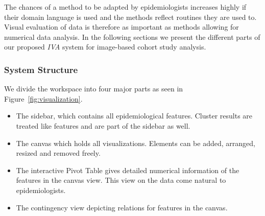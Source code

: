 \documentclass[journal]{style/vgtc} 			          %
\begin{document}
%
%
The chances of a method to be adapted by epidemiologists increases highly if their domain language is used and the methods reflect routines they are used to.
%
Visual evaluation of data is therefore as important as methods allowing for numerical data analysis.
%
In the following sections we present the different parts of our proposed \emph{IVA} system for image-based cohort study analysis.


\subsubsection{System Structure} \label{Structure and Workflow}
We divide the workspace into four major parts as seen in Figure~\ref{fig:visualization}.
\begin{itemize}
	\item The sidebar, which contains all epidemiological features. Cluster results are treated like features and are part of the sidebar as well.
	\item The canvas which holds all visualizations. Elements can be added, arranged, resized and removed freely.
	\item The interactive Pivot Table gives detailed numerical information of the features in the canvas view. This view on the data come natural to epidemiologists.
	\item The contingency view depicting relations for features in the canvas.
\end{itemize}
%
% 
% 
\end{document}
